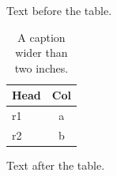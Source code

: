 \documentclass[12pt]{article}
\begin{document}
\setlength{\LTcapwidth}{2in}
Text before the table.

\begin{longtable}{lc}
\caption{A caption wider than two inches.}\\
\hline Head & Col\\\hline
\endfirsthead
\hline
\endlastfoot
r1 & a\\
r2 & b\\
\end{longtable}

Text after the table.
\end{document}
